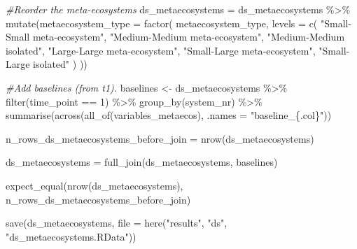 \documentclass[
]{article}
\newenvironment{Shaded}{\begin{snugshade}}{\end{snugshade}}
\newcommand{\AttributeTok}[1]{\textcolor[rgb]{0.77,0.63,0.00}{#1}}
\newcommand{\CommentTok}[1]{\textcolor[rgb]{0.56,0.35,0.01}{\textit{#1}}}
\newcommand{\DecValTok}[1]{\textcolor[rgb]{0.00,0.00,0.81}{#1}}
\newcommand{\FunctionTok}[1]{\textcolor[rgb]{0.00,0.00,0.00}{#1}}
\newcommand{\NormalTok}[1]{#1}
\newcommand{\OtherTok}[1]{\textcolor[rgb]{0.56,0.35,0.01}{#1}}
\newcommand{\SpecialCharTok}[1]{\textcolor[rgb]{0.00,0.00,0.00}{#1}}
\newcommand{\StringTok}[1]{\textcolor[rgb]{0.31,0.60,0.02}{#1}}
\begin{document}
\begin{Shaded}
\begin{Highlighting}[]
\CommentTok{\#Reorder the meta{-}ecosystems}
\NormalTok{ds\_metaecosystems }\OtherTok{=}\NormalTok{ ds\_metaecosystems }\SpecialCharTok{\%\textgreater{}\%}
  \FunctionTok{mutate}\NormalTok{(}\AttributeTok{metaecosystem\_type =} \FunctionTok{factor}\NormalTok{(}
\NormalTok{    metaecosystem\_type,}
    \AttributeTok{levels =} \FunctionTok{c}\NormalTok{(}
      \StringTok{"Small{-}Small meta{-}ecosystem"}\NormalTok{,}
      \StringTok{"Medium{-}Medium meta{-}ecosystem"}\NormalTok{,}
      \StringTok{"Medium{-}Medium isolated"}\NormalTok{,}
      \StringTok{"Large{-}Large meta{-}ecosystem"}\NormalTok{,}
      \StringTok{"Small{-}Large meta{-}ecosystem"}\NormalTok{,}
      \StringTok{"Small{-}Large isolated"}
\NormalTok{    )}
\NormalTok{  ))}
\end{Highlighting}
\end{Shaded}

\begin{Shaded}
\begin{Highlighting}[]
\CommentTok{\#Add baselines (from t1).}
\NormalTok{baselines }\OtherTok{\textless{}{-}}\NormalTok{ ds\_metaecosystems }\SpecialCharTok{\%\textgreater{}\%}
  \FunctionTok{filter}\NormalTok{(time\_point }\SpecialCharTok{==} \DecValTok{1}\NormalTok{) }\SpecialCharTok{\%\textgreater{}\%}
  \FunctionTok{group\_by}\NormalTok{(system\_nr) }\SpecialCharTok{\%\textgreater{}\%}
  \FunctionTok{summarise}\NormalTok{(}\FunctionTok{across}\NormalTok{(}\FunctionTok{all\_of}\NormalTok{(variables\_metaecos), }\AttributeTok{.names =} \StringTok{"baseline\_\{.col\}"}\NormalTok{))}

\NormalTok{n\_rows\_ds\_metaecosystems\_before\_join }\OtherTok{=} \FunctionTok{nrow}\NormalTok{(ds\_metaecosystems)}

\NormalTok{ds\_metaecosystems }\OtherTok{=} \FunctionTok{full\_join}\NormalTok{(ds\_metaecosystems, baselines)}

\FunctionTok{expect\_equal}\NormalTok{(}\FunctionTok{nrow}\NormalTok{(ds\_metaecosystems),}
\NormalTok{             n\_rows\_ds\_metaecosystems\_before\_join)}
\end{Highlighting}
\end{Shaded}

\begin{Shaded}
\begin{Highlighting}[]
\FunctionTok{save}\NormalTok{(ds\_metaecosystems, }\AttributeTok{file =} \FunctionTok{here}\NormalTok{(}\StringTok{"results"}\NormalTok{, }\StringTok{"ds"}\NormalTok{, }\StringTok{"ds\_metaecosystems.RData"}\NormalTok{))}
\end{Highlighting}
\end{Shaded}
\end{document}
